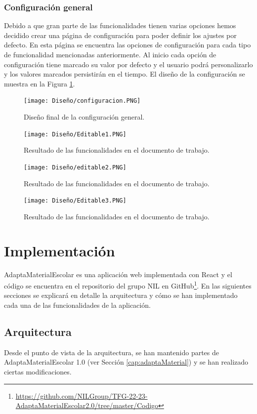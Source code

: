 \subsubsection{Configuración general}
Debido a que gran parte de las funcionalidades tienen varias opciones hemos decidido crear una página de configuración para poder definir los ajustes por defecto. En esta página se encuentra las opciones de configuración para cada tipo de funcionalidad mencionadas anteriormente. Al inicio cada opción de configuración tiene marcado su valor por defecto y el usuario podrá personalizarlo y los valores marcados persistirán en el tiempo. El diseño de la configuración se muestra en la Figura \ref{configu}.

\begin{figure}[ht!]
  \centering
  \texttt{[image: Diseño/configuracion.PNG]}
  \caption{Diseño final de la configuración general.}
  \label{configu}
\end{figure}


\begin{figure}[ht!]
  \centering
  \texttt{[image: Diseño/Editable1.PNG]}
  \caption{Resultado de las funcionalidades en el documento de trabajo.}
  \label{editable1}
\end{figure}

\begin{figure}[ht!]
  \centering
  \texttt{[image: Diseño/editable2.PNG]}
  \caption{Resultado de las funcionalidades en el documento de trabajo.}
  \label{editable2}
\end{figure}

\begin{figure}[ht!]
  \centering
  \texttt{[image: Diseño/Editable3.PNG]}
  \caption{Resultado de las funcionalidades en el documento de trabajo.}
  \label{editable3}
\end{figure}

\section{Implementación}
\label{sec:implmentaction}
AdaptaMaterialEscolar es una aplicación web implementada con React y el código se encuentra en el repositorio del grupo NIL en GitHub\footnote{\url{https://github.com/NILGroup/TFG-22-23-AdaptaMaterialEscolar2.0/tree/master/Codigo}}. En las siguientes secciones se explicará en detalle la arquitectura y cómo se han implementado cada una de las funcionalidades de la aplicación.
\subsection{Arquitectura}
\label{sub:Arquitectura}
Desde el punto de vista de la arquitectura, se han mantenido partes de AdaptaMaterialEscolar 1.0 (ver Sección \ref{cap:adaptaMaterial}) y se han realizado ciertas modificaciones.

